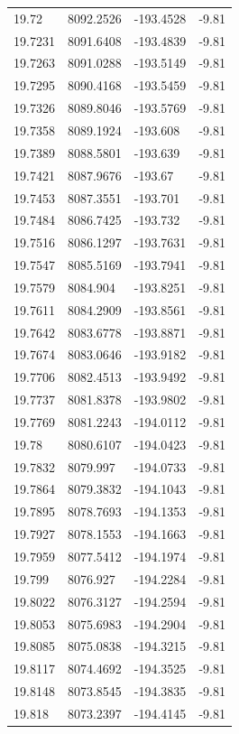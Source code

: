 \begin{table}[H]
\begin{tabular}{llll}
19.72 & 8092.2526 & -193.4528 & -9.81 \\
19.7231 & 8091.6408 & -193.4839 & -9.81 \\
19.7263 & 8091.0288 & -193.5149 & -9.81 \\
19.7295 & 8090.4168 & -193.5459 & -9.81 \\
19.7326 & 8089.8046 & -193.5769 & -9.81 \\
19.7358 & 8089.1924 & -193.608 & -9.81 \\
19.7389 & 8088.5801 & -193.639 & -9.81 \\
19.7421 & 8087.9676 & -193.67 & -9.81 \\
19.7453 & 8087.3551 & -193.701 & -9.81 \\
19.7484 & 8086.7425 & -193.732 & -9.81 \\
19.7516 & 8086.1297 & -193.7631 & -9.81 \\
19.7547 & 8085.5169 & -193.7941 & -9.81 \\
19.7579 & 8084.904 & -193.8251 & -9.81 \\
19.7611 & 8084.2909 & -193.8561 & -9.81 \\
19.7642 & 8083.6778 & -193.8871 & -9.81 \\
19.7674 & 8083.0646 & -193.9182 & -9.81 \\
19.7706 & 8082.4513 & -193.9492 & -9.81 \\
19.7737 & 8081.8378 & -193.9802 & -9.81 \\
19.7769 & 8081.2243 & -194.0112 & -9.81 \\
19.78 & 8080.6107 & -194.0423 & -9.81 \\
19.7832 & 8079.997 & -194.0733 & -9.81 \\
19.7864 & 8079.3832 & -194.1043 & -9.81 \\
19.7895 & 8078.7693 & -194.1353 & -9.81 \\
19.7927 & 8078.1553 & -194.1663 & -9.81 \\
19.7959 & 8077.5412 & -194.1974 & -9.81 \\
19.799 & 8076.927 & -194.2284 & -9.81 \\
19.8022 & 8076.3127 & -194.2594 & -9.81 \\
19.8053 & 8075.6983 & -194.2904 & -9.81 \\
19.8085 & 8075.0838 & -194.3215 & -9.81 \\
19.8117 & 8074.4692 & -194.3525 & -9.81 \\
19.8148 & 8073.8545 & -194.3835 & -9.81 \\
19.818 & 8073.2397 & -194.4145 & -9.81 \\

\end{tabular}
\end{table}
